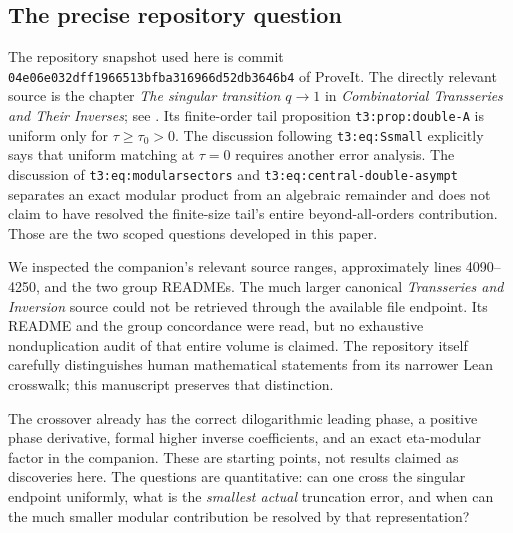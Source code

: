 \documentclass[11pt,a4paper]{article}
\theoremstyle{definition}
\theoremstyle{remark}
\begin{document}
\subsection{The precise repository question}
The repository snapshot used here is commit
\texttt{04e06e032dff1966513bfba316966d52db3646b4} of ProveIt. The directly
relevant source is the chapter \emph{The singular transition $q\to1$} in
\emph{Combinatorial Transseries and Their Inverses}; see
\cite{repo,reporeadme}. Its finite-order tail proposition
\texttt{t3:prop:double-A} is uniform only for $\tau\ge\tau_0>0$.
The discussion following \texttt{t3:eq:Ssmall} explicitly says that uniform
matching at $\tau=0$ requires another error analysis. The discussion of
\texttt{t3:eq:modularsectors} and
\texttt{t3:eq:central-double-asympt} separates an exact modular product from
an algebraic remainder and does not claim to have resolved the finite-size
tail's entire beyond-all-orders contribution. Those are the two scoped
questions developed in this paper.

We inspected the companion's relevant source ranges, approximately
lines 4090--4250, and the two group READMEs. The much larger canonical
\emph{Transseries and Inversion} source could not be retrieved through the
available file endpoint. Its README and the group concordance were read,
but no exhaustive nonduplication audit of that entire volume is claimed.
The repository itself carefully distinguishes human mathematical statements
from its narrower Lean crosswalk; this manuscript preserves that distinction.

The crossover already has the correct dilogarithmic leading phase, a
positive phase derivative, formal higher inverse coefficients, and an exact
eta-modular factor in the companion. These are starting points, not results
claimed as discoveries here. The questions are quantitative: can one cross
the singular endpoint uniformly, what is the \emph{smallest actual}
truncation error, and when can the much smaller modular contribution be
resolved by that representation?
\end{document}
